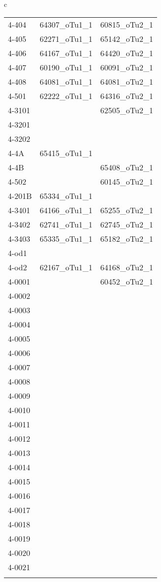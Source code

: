 \begin{table}[htbp]
\begin{center}
\begin{tabular}{c}
{{\begin{minipage}{0.5\hsize}
\begin{center}
\begin{tabular}{lcc}
   4-404 & 64307\_oTu1\_1 & 60815\_oTu2\_1 \\
   4-405 & 62271\_oTu1\_1 & 65142\_oTu2\_1 \\
   4-406 & 64167\_oTu1\_1 & 64420\_oTu2\_1 \\
   4-407 & 60190\_oTu1\_1 & 60091\_oTu2\_1 \\
   4-408 & 64081\_oTu1\_1 & 64081\_oTu2\_1 \\
   4-501 & 62222\_oTu1\_1 & 64316\_oTu2\_1 \\
   4-3101 &   & 62505\_oTu2\_1 \\
   4-3201 &   &   \\
   4-3202 &   &   \\
   4-4A & 65415\_oTu1\_1 &   \\
   4-4B &   & 65408\_oTu2\_1 \\
   4-502 &   & 60145\_oTu2\_1 \\
   4-201B & 65334\_oTu1\_1 &   \\
   4-3401 & 64166\_oTu1\_1 & 65255\_oTu2\_1 \\
   4-3402 & 62741\_oTu1\_1 & 62745\_oTu2\_1 \\
   4-3403 & 65335\_oTu1\_1 & 65182\_oTu2\_1 \\
   4-od1 &   &   \\
   4-od2 & 62167\_oTu1\_1 & 64168\_oTu2\_1 \\
   4-0001 &   & 60452\_oTu2\_1 \\
\if0
   4-0002 &   &   \\
   4-0003 &   &   \\
   4-0004 &   &   \\
   4-0005 &   &   \\
   4-0006 &   &   \\
   4-0007 &   &   \\
   4-0008 &   &   \\
   4-0009 &   &   \\
   4-0010 &   &   \\
   4-0011 &   &   \\
   4-0012 &   &   \\
   4-0013 &   &   \\
   4-0014 &   &   \\
   4-0015 &   &   \\
   4-0016 &   &   \\
   4-0017 &   &   \\
   4-0018 &   &   \\
   4-0019 &   &   \\
   4-0020 &   &   \\
   4-0021 &   &   \\
\fi
   \hline
  \end{tabular}
 \end{center}
\end{minipage}



}  }
  \end{tabular}
 \end{center}
\end{table}

